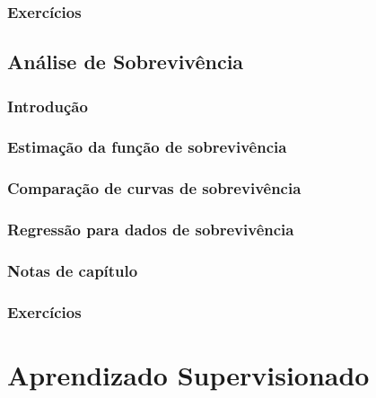 \documentclass[
]{latex/krantz}
\theoremstyle{definition}
\theoremstyle{definition}
\theoremstyle{definition}
\theoremstyle{definition}
\theoremstyle{remark}
\begin{document}
\hypertarget{exercuxedcios-4}{%
\section{Exercícios}\label{exercuxedcios-4}}

\hypertarget{anuxe1lise-de-sobrevivuxeancia}{%
\chapter{Análise de Sobrevivência}\label{anuxe1lise-de-sobrevivuxeancia}}

\hypertarget{introduuxe7uxe3o-5}{%
\section{Introdução}\label{introduuxe7uxe3o-5}}

\hypertarget{estimauxe7uxe3o-da-funuxe7uxe3o-de-sobrevivuxeancia}{%
\section{Estimação da função de sobrevivência}\label{estimauxe7uxe3o-da-funuxe7uxe3o-de-sobrevivuxeancia}}

\hypertarget{comparauxe7uxe3o-de-curvas-de-sobrevivuxeancia}{%
\section{Comparação de curvas de sobrevivência}\label{comparauxe7uxe3o-de-curvas-de-sobrevivuxeancia}}

\hypertarget{regressuxe3o-para-dados-de-sobrevivuxeancia}{%
\section{Regressão para dados de sobrevivência}\label{regressuxe3o-para-dados-de-sobrevivuxeancia}}

\hypertarget{notas-de-capuxedtulo-5}{%
\section{Notas de capítulo}\label{notas-de-capuxedtulo-5}}

\hypertarget{exercuxedcios-5}{%
\section{Exercícios}\label{exercuxedcios-5}}

\hypertarget{part-aprendizado-supervisionado}{%
\part{Aprendizado Supervisionado}\label{part-aprendizado-supervisionado}}
\end{document}
